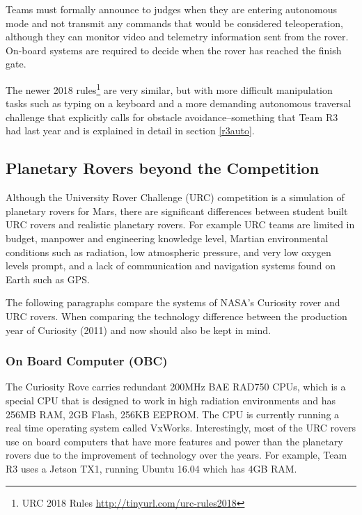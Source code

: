 \documentclass[runningheads,a4paper]{llncs}
\begin{document}
Teams must formally announce to judges when they are entering autonomous mode and not transmit any commands that would be considered teleoperation, although they can monitor video and telemetry information sent from the rover. On-board systems are required to decide when the rover has reached the finish gate.

The newer 2018 rules\footnote{URC 2018 Rules \url{http://tinyurl.com/urc-rules2018}} are very similar, but with more difficult manipulation tasks such as typing on a keyboard and a more demanding autonomous traversal challenge that explicitly calls for obstacle avoidance–something that Team R3 had last year and is explained in detail in section \ref{r3auto}.

\subsection{Planetary Rovers beyond the Competition}\label{planetary}

Although the University Rover Challenge (URC) competition is a simulation of planetary rovers for Mars, there are significant differences between student built URC rovers and realistic planetary rovers. For example URC teams are limited in budget, manpower and engineering knowledge level, Martian environmental conditions such as radiation, low atmospheric pressure, and very low oxygen levels prompt, and a lack of communication and navigation systems found on Earth such as GPS.

The following paragraphs compare the systems of NASA's Curiosity rover\cite{nasa1}\cite{nasa2} and URC rovers. When comparing the technology difference between the production year of Curiosity (2011) and now should also be kept in mind.

\subsubsection*{On Board Computer (OBC)} The Curiosity Rove carries redundant 200MHz BAE RAD750 CPUs, which is a special CPU that is designed to work in high radiation environments and has 256MB RAM, 2GB Flash, 256KB EEPROM. The CPU is currently running a real time operating system called VxWorks. Interestingly, most of the URC rovers use on board computers that have more features and power than the planetary rovers due to the improvement of technology over the years. For example, Team R3 uses a Jetson TX1, running Ubuntu 16.04 which has 4GB RAM.
\end{document}
